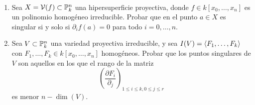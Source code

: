 \documentclass[twoside]{article}
\begin{document}
\newpage
\begin{ejercicio}{4}\
 
\begin{enumerate}
\item Sea $X = \mathcal{V}(f)\subset \mathbb{P}^n_k$ una hipersuperficie proyectiva, donde $f\in k[x_0,\dotsc,x_n]$ es un polinomio homogéneo irreducible. Probar que en el punto $a\in X$ es singular si y solo si $\partial_i f(a) = 0$ para todo $i=0,\dotsc,n$. 
\item Sea $V\subset \mathbb{P}^n_k$ una variedad proyectiva irreducible, y sea $I(V )= \langle{F_1,\dotsc,F_k}\rangle$ con $F_1,\dotsc,F_k \in k[x_0,\dotsc,x_n]$ homogéneos. Probar que los puntos singulares de $V$ son aquellos en los que el rango de la matriz 
$$
\left(
\frac{\partial F_i}{\partial_j}\right)_{1\leq i \leq k, 0\leq j \leq r}
$$
es menor $n-\dim(V)$.
\end{enumerate}
\end{ejercicio}
\end{document}
